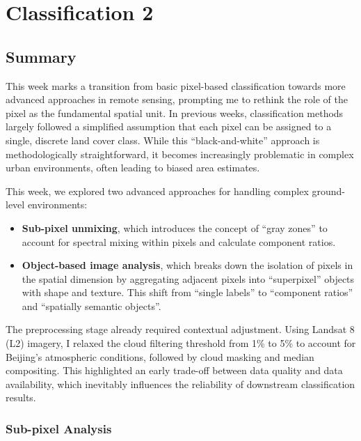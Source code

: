 \documentclass[
  letterpaper,
  DIV=11,
  numbers=noendperiod]{scrreprt}
\begin{document}

\chapter{Classification 2}\label{classification-2}

\section{Summary}\label{summary-3}

This week marks a transition from basic pixel-based classification
towards more advanced approaches in remote sensing, prompting me to
rethink the role of the pixel as the fundamental spatial unit. In
previous weeks, classification methods largely followed a simplified
assumption that each pixel can be assigned to a single, discrete land
cover class. While this ``black-and-white'' approach is methodologically
straightforward, it becomes increasingly problematic in complex urban
environments, often leading to biased area estimates.

This week, we explored two advanced approaches for handling complex
ground-level environments:

\begin{itemize}
\item
  \textbf{Sub-pixel unmixing}, which introduces the concept of ``gray
  zones'' to account for spectral mixing within pixels and calculate
  component ratios.
\item
  \textbf{Object-based image analysis}, which breaks down the isolation
  of pixels in the spatial dimension by aggregating adjacent pixels into
  ``superpixel'' objects with shape and texture. This shift from
  ``single labels'' to ``component ratios'' and ``spatially semantic
  objects''.
\end{itemize}

The preprocessing stage already required contextual adjustment. Using
Landsat 8 (L2) imagery, I relaxed the cloud filtering threshold from 1\%
to 5\% to account for Beijing's atmospheric conditions, followed by
cloud masking and median compositing. This highlighted an early
trade-off between data quality and data availability, which inevitably
influences the reliability of downstream classification results.

\subsection{Sub-pixel Analysis}\label{sub-pixel-analysis}
\end{document}
